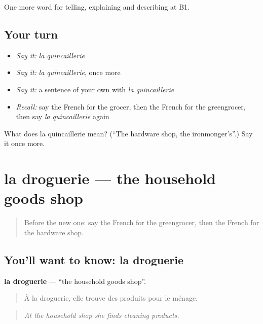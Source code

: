 \begin{grammarlens}[title={What you've built}]
One more word for telling, explaining and describing at B1.
\end{grammarlens}

\subsection*{Your turn}
\begin{itemize}
\raggedright
  \item \emph{Say it:} \emph{la quincaillerie}
  \item \emph{Say it:} \emph{la quincaillerie}, once more
  \item \emph{Say it:} a sentence of your own with \emph{la quincaillerie}
  \item \emph{Recall:} say the French for the grocer, then the French for the greengrocer, then say \emph{la quincaillerie} again
\end{itemize}

\begin{tcolorbox}[breakable,colback=teal!4,colframe=teal!35!black,title={Before you move on}]
What does la quincaillerie mean? (\textquotedblleft{}The hardware shop, the ironmonger’s\textquotedblright{}.) Say it once more.
\end{tcolorbox}
\section[la droguerie]{la droguerie — the household goods shop}

\label{lesson:FR-C445-droguerie}



\begin{quote}
Before the new one: say the French for the greengrocer, then the French for the hardware shop.
\end{quote}

\subsection*{You'll want to know: la droguerie}
\textbf{la droguerie} — \textquotedblleft{}the household goods shop\textquotedblright{}.

\begin{quote}
À la droguerie, elle trouve des produits pour le ménage.
\end{quote}

\begin{quote}
\emph{At the household shop she finds cleaning products.}
\end{quote}

